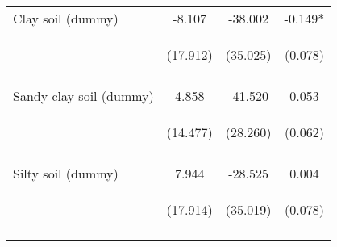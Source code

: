 \begin{center}
\begin{tabular}{lccc}
Clay soil (dummy) & -8.107 & -38.002 & -0.149* \\
 & \begin{footnotesize}(17.912)\end{footnotesize} & \begin{footnotesize}(35.025)\end{footnotesize} & \begin{footnotesize}(0.078)\end{footnotesize} \\
\vspace{4pt} & \begin{footnotesize}[0.651]\end{footnotesize} & \begin{footnotesize}[0.278]\end{footnotesize} & \begin{footnotesize}[0.057]\end{footnotesize} \\
Sandy-clay soil (dummy) & 4.858 & -41.520 & 0.053 \\
 & \begin{footnotesize}(14.477)\end{footnotesize} & \begin{footnotesize}(28.260)\end{footnotesize} & \begin{footnotesize}(0.062)\end{footnotesize} \\
\vspace{4pt} & \begin{footnotesize}[0.737]\end{footnotesize} & \begin{footnotesize}[0.142]\end{footnotesize} & \begin{footnotesize}[0.392]\end{footnotesize} \\
Silty soil (dummy) & 7.944 & -28.525 & 0.004 \\
 & \begin{footnotesize}(17.914)\end{footnotesize} & \begin{footnotesize}(35.019)\end{footnotesize} & \begin{footnotesize}(0.078)\end{footnotesize} \\
\vspace{4pt} & \begin{footnotesize}[0.657]\end{footnotesize} & \begin{footnotesize}[0.415]\end{footnotesize} & \begin{footnotesize}[0.963]\end{footnotesize} \\

\end{tabular}
\end{center}

